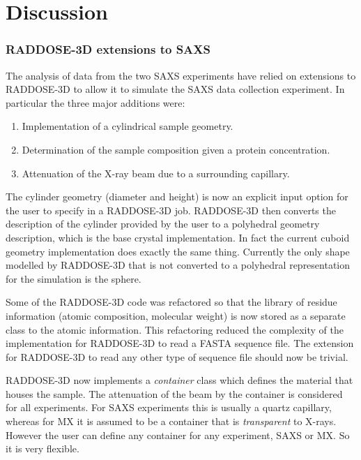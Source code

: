 \section{Discussion}
\label{sec:Discussion - SAXS}

\subsubsection{RADDOSE-3D extensions to SAXS}
\label{subs:RADDOSE-3D extensions to SAXS}

The analysis of data from the two SAXS experiments have relied on extensions to RADDOSE-3D to allow it to simulate the SAXS data collection experiment.
In particular the three major additions were:
\begin{enumerate}
    \item Implementation of a cylindrical sample geometry.
    \item Determination of the sample composition given a protein concentration.
    \item Attenuation of the X-ray beam due to a surrounding capillary.
\end{enumerate}
The cylinder geometry (diameter and height) is now an explicit input option for the user to specify in a RADDOSE-3D job.
RADDOSE-3D then converts the description of the cylinder provided by the user to a polyhedral geometry description, which is the base crystal implementation.
In fact the current cuboid geometry implementation does exactly the same thing.
Currently the only shape modelled by RADDOSE-3D that is not converted to a polyhedral representation for the simulation is the sphere.

Some of the RADDOSE-3D code was refactored so that the library of residue information (atomic composition, molecular weight) is now stored as a separate class to the atomic information. This refactoring reduced the complexity of the implementation for RADDOSE-3D to read a FASTA sequence file. The extension for RADDOSE-3D to read any other type of sequence file should now be trivial.

RADDOSE-3D now implements a \textit{container} class which defines the material that houses the sample.
The attenuation of the beam by the container is considered for all experiments.
For SAXS experiments this is usually a quartz capillary, whereas for MX it is assumed to be a container that is \textit{transparent} to X-rays.
However the user can define any container for any experiment, SAXS or MX. So it is very flexible.

